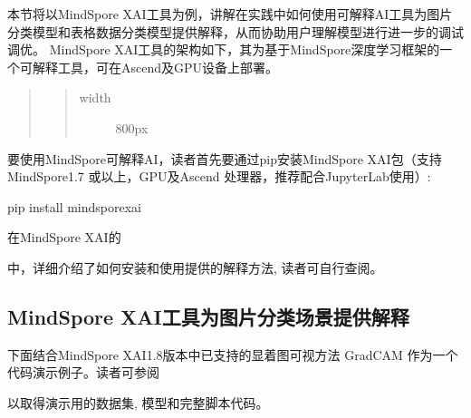 \documentclass[letterpaper,10pt,english]{sphinxmanual}
\begin{document}
\sphinxAtStartPar
本节将以MindSpore
XAI工具为例，讲解在实践中如何使用可解释AI工具为图片分类模型和表格数据分类模型提供解释，从而协助用户理解模型进行进一步的调试调优。
MindSpore
XAI工具的架构如下，其为基于MindSpore深度学习框架的一个可解释工具，可在Ascend及GPU设备上部署。
\begin{center}\end{center}
\begin{quote}
\begin{quote}\begin{description}
\item[{width}] \leavevmode
\sphinxAtStartPar
800px

\end{description}\end{quote}
\end{quote}

\sphinxAtStartPar
要使用MindSpore可解释AI，读者首先要通过pip安装MindSpore
XAI包（支持MindSpore1.7 或以上，GPU及Ascend
处理器，推荐配合JupyterLab使用）:

\begin{sphinxVerbatim}[commandchars=\\\{\}]
pip install mindspore\PYGZhy{}xai
\end{sphinxVerbatim}

\sphinxAtStartPar
在MindSpore
XAI的%
\begin{footnote}[85]\sphinxAtStartFootnote
{}
%
\end{footnote}中，详细介绍了如何安装和使用提供的解释方法,
读者可自行查阅。


\subsection{MindSpore XAI工具为图片分类场景提供解释}
\label{\detokenize{chapter_explainable_AI/explainable_ai:id18}}
\sphinxAtStartPar
下面结合MindSpore XAI1.8版本中已支持的显着图可视方法 GradCAM
作为一个代码演示例子。读者可参阅%
\begin{footnote}[86]\sphinxAtStartFootnote
{}
%
\end{footnote}以取得演示用的数据集,
模型和完整脚本代码。
\end{document}
